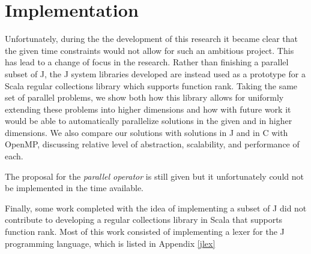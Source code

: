\section{Implementation}
\label{imp}
Unfortunately, during the the development of this research it became clear that the given time constraints would not allow for such an ambitious project.
This has lead to a change of focus in the research. 
Rather than finishing a parallel subset of J, the J system libraries developed 
are instead used as a prototype for a Scala regular collections library which supports function rank.
Taking the same set of parallel problems, we show both how this library allows for uniformly extending these problems into higher dimensions and 
how with future work it would be able to automatically parallelize solutions in the given and in higher dimensions.
We also compare our solutions with solutions in J and in C with OpenMP, discussing relative level of abstraction, scalability, and performance of each.

The proposal for the \textit{parallel operator} is still given but it unfortunately could not be implemented in the time available.

Finally, some work completed with the idea of implementing a subset of J did not contribute to developing a regular collections library in Scala that supports function rank.
Most of this work consisted of implementing a lexer for the J programming language, which is listed in Appendix \ref{jlex}
